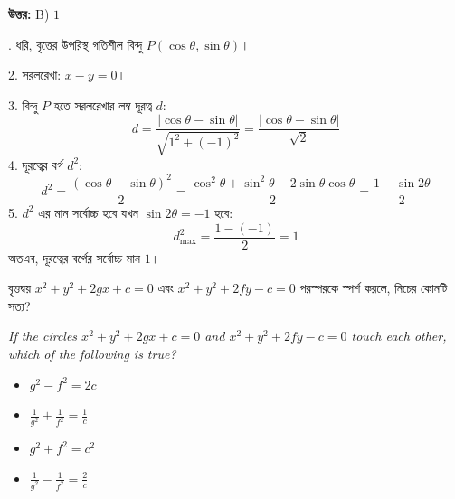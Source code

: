 \documentclass[12pt, a4paper]{article}
\begin{document}
\vspace{0.5em}
\begin{tcolorbox}[answerbox]
    \textbf{\color{success} উত্তর:} B) $1$
\end{tcolorbox}
\vspace{1em}

\begin{tcolorbox}[solutionbox={সমাধান (Solution)}]
    . ধরি, বৃত্তের উপরিস্থ গতিশীল বিন্দু $P(\cos\theta, \sin\theta)$।
    
    2. সরলরেখা: $x - y = 0$।
    
    \vspace{0.5em}
    3. বিন্দু $P$ হতে সরলরেখার লম্ব দূরত্ব $d$:
    \[ d = \frac{|\cos\theta - \sin\theta|}{\sqrt{1^2 + (-1)^2}} = \frac{|\cos\theta - \sin\theta|}{\sqrt{2}} \]
    4. দূরত্বের বর্গ $d^2$:
    \[ d^2 = \frac{(\cos\theta - \sin\theta)^2}{2} = \frac{\cos^2\theta + \sin^2\theta - 2\sin\theta\cos\theta}{2} = \frac{1 - \sin 2\theta}{2} \]
    5. $d^2$ এর মান সর্বোচ্চ হবে যখন $\sin 2\theta = -1$ হবে:
    \[ d^2_{\max} = \frac{1 - (-1)}{2} = 1 \]
    অতএব, দূরত্বের বর্গের সর্বোচ্চ মান $1$।
\end{tcolorbox}

\begin{tcolorbox}[questionbox={প্রশ্ন (Question) 28}]
    \noindent
    বৃত্তদ্বয় $x^2 + y^2 + 2gx + c = 0$ এবং $x^2 + y^2 + 2fy - c = 0$ পরস্পরকে স্পর্শ করলে, নিচের কোনটি সত্য?
    
    \vspace{0.8em}
    \begin{english}
    \noindent\textit{\color{darkgray}
    If the circles $x^2 + y^2 + 2gx + c = 0$ and $x^2 + y^2 + 2fy - c = 0$ touch each other, which of the following is true?
    }
    \end{english}
\end{tcolorbox}

\begin{itemize}[label={}, leftmargin=1cm, itemsep=0.5em]
    \item[\textbf{A)}] $g^2 - f^2 = 2c$
    \item[\textbf{B)}] $\frac{1}{g^2} + \frac{1}{f^2} = \frac{1}{c}$
    \item[\textbf{C)}] $g^2 + f^2 = c^2$
    \item[\textbf{D)}] $\frac{1}{g^2} - \frac{1}{f^2} = \frac{2}{c}$
\end{itemize}
\end{document}
